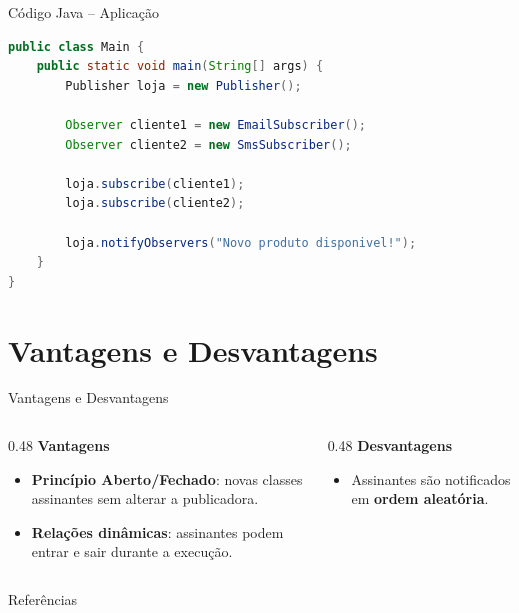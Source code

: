 \documentclass[aspectratio=169]{beamer}
\begin{document}
\begin{frame}[fragile]{Código Java -- Aplicação}
\begin{lstlisting}[language=Java,title={Uso no main}]
public class Main {
    public static void main(String[] args) {
        Publisher loja = new Publisher();

        Observer cliente1 = new EmailSubscriber();
        Observer cliente2 = new SmsSubscriber();

        loja.subscribe(cliente1);
        loja.subscribe(cliente2);

        loja.notifyObservers("Novo produto disponivel!");
    }
}
\end{lstlisting}
\end{frame}

\section{Vantagens e Desvantagens}

\begin{frame}{Vantagens e Desvantagens}
    \begin{columns}[T]
        \begin{column}{0.48\textwidth}
            \textbf{Vantagens}
            \begin{itemize}
                \item \textbf{Princípio Aberto/Fechado}: novas classes assinantes sem alterar a publicadora.
                \item \textbf{Relações dinâmicas}: assinantes podem entrar e sair durante a execução.
            \end{itemize}
        \end{column}
        \begin{column}{0.48\textwidth}
            \textbf{Desvantagens}
            \begin{itemize}
                \item Assinantes são notificados em \textbf{ordem aleatória}.
            \end{itemize}
        \end{column}
    \end{columns}
\end{frame}

\begin{frame}[allowframebreaks]{Referências}
    \nocite{*}
    \printbibliography
\end{frame}
\end{document}
